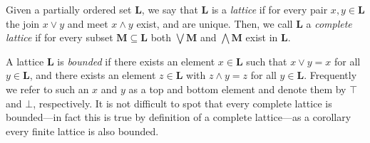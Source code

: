 \begin{definition}
	\label{definition:lattice} Given a partially ordered set $\mathbf{L}$, we say that $\mathbf{L}$ is a \textit{lattice} if
	for every pair $x, y \in \mathbf{L}$ the join $x \vee y$ and meet $x \wedge y$ exist, and are unique. Then, we call
	$\mathbf{L}$ a \textit{complete lattice} if for every subset $\mathbf{M}\subseteq \mathbf{L}$ both $\bigvee \mathbf{M}$
	and $\bigwedge \mathbf{M}$ exist in $\mathbf{L}$.
\end{definition}


A lattice $\mathbf{L}$ is \textit{bounded} if there exists an element $x \in \mathbf{L}$ such that $x \vee y = x$ for
all $y \in \mathbf{L}$, and there exists an element $z \in \mathbf{L}$ with $z \wedge y = z$ for all $y \in \mathbf{L}$.
Frequently we refer to such an $x$ and $y$ as a top and bottom element and denote them by $\top$ and $\bot$, respectively.
It is not difficult to spot that every complete lattice is bounded---in fact this is true by definition of a complete
lattice---as a corollary every finite lattice is also bounded.


